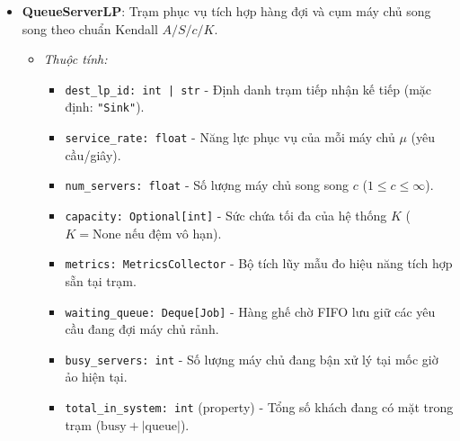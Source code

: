 \begin{itemize}[leftmargin=1.5em, itemsep=8pt]
\begin{itemize}[leftmargin=1.2em, label={}, itemsep=3pt]
\item[\textendash] \textit{Phương thức:}
\begin{itemize}[leftmargin=1.5em, label=+, itemsep=2pt]
\item \texttt{initialize(): void} / \texttt{start(): void} - Kích hoạt tự lên lịch sự kiện đến đầu tiên $\Delta t \sim \text{Exp}(\lambda)$.
\item \texttt{handle\_event(event: Event): void} - Đóng gói thực thể \texttt{Job}, chuyển tiếp sang trạm sau và tự lên lịch khách kế tiếp.
\end{itemize}
\end{itemize}

\item \textbf{QueueServerLP}: Trạm phục vụ tích hợp hàng đợi và cụm máy chủ song song theo chuẩn Kendall $A/S/c/K$.

\begin{itemize}[leftmargin=1.2em, label={}, itemsep=3pt]
\item[\textendash] \textit{Thuộc tính:}
\begin{itemize}[leftmargin=1.5em, label=+, itemsep=2pt]
\item \texttt{dest\_lp\_id: int | str} - Định danh trạm tiếp nhận kế tiếp (mặc định: \texttt{"Sink"}).
\item \texttt{service\_rate: float} - Năng lực phục vụ của mỗi máy chủ $\mu$ (yêu cầu/giây).
\item \texttt{num\_servers: float} - Số lượng máy chủ song song $c$ ($1 \le c \le \infty$).
\item \texttt{capacity: Optional[int]} - Sức chứa tối đa của hệ thống $K$ ($K = \text{None}$ nếu đệm vô hạn).
\item \texttt{metrics: MetricsCollector} - Bộ tích lũy mẫu đo hiệu năng tích hợp sẵn tại trạm.
\item \texttt{waiting\_queue: Deque[Job]} - Hàng ghế chờ FIFO lưu giữ các yêu cầu đang đợi máy chủ rảnh.
\item \texttt{busy\_servers: int} - Số lượng máy chủ đang bận xử lý tại mốc giờ ảo hiện tại.
\item \texttt{total\_in\_system: int} (property) - Tổng số khách đang có mặt trong trạm ($\text{busy} + |\text{queue}|$).
\end{itemize}


\end{itemize}
\end{itemize}
